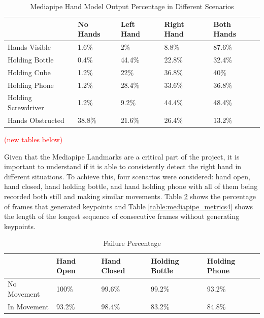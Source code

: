 \begin{table}[H]
    \centering
    \caption{Mediapipe Hand Model Output Percentage in Different Scenarios}
    \label{table:mediapipe_metrics}
    \begin{tabular}{|l|l|l|l|l|}
        \hline
        & No Hands & Left Hand & Right Hand & Both Hands \\
        \hline
        Hands Visible & 1.6\% & 2\% & 8.8\% & 87.6\% \\
        \hline
        Holding Bottle & 0.4\% & 44.4\% & 22.8\% & 32.4\% \\
        \hline
        Holding Cube & 1.2\% & 22\% & 36.8\% & 40\% \\
        \hline
        Holding Phone & 1.2\% & 28.4\% & 33.6\% & 36.8\% \\
        \hline
        Holding Screwdriver & 1.2\% & 9.2\% & 44.4\% & 48.4\% \\
        \hline
        Hands Obstructed & 38.8\% & 21.6\% & 26.4\% & 13.2\% \\
        \hline
    \end{tabular}
\end{table}

\textcolor{red}{(new tables below)}

Given that the Mediapipe Landmarks are a critical part of the project, it is important to understand if it is able to consistently detect the right hand in different situations. To achieve this, four scenarios were considered: hand open, hand closed, hand holding bottle, and hand holding phone with all of them being recorded both still and making similar movements. Table \ref{table:mediapipe_metrics3} shows the percentage of frames that generated keypoints and Table \ref{table:mediapipe_metrics4} shows the length of the longest sequence of consecutive frames without generating keypoints.

\begin{table}[H]
    \centering
    \caption{Failure Percentage}
    \label{table:mediapipe_metrics3}
    \begin{tabular}{|l|l|l|l|l|}
        \hline
        & Hand Open & Hand Closed & Holding Bottle & Holding Phone \\
        \hline
        No Movement & 100\% & 99.6\% & 99.2\% & 93.2\% \\
        \hline
        In Movement & 93.2\% & 98.4\% & 83.2\% & 84.8\% \\
        \hline
    \end{tabular}
\end{table}

